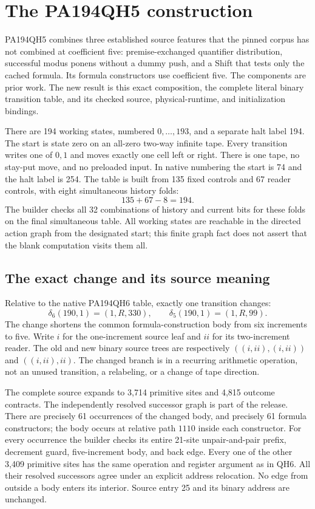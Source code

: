 \section{The PA194QH5 construction}
\label{sec:qh5}

PA194QH5 combines three established source features that the pinned corpus
has not combined at coefficient five: premise-exchanged quantifier
distribution, successful modus ponens without a dummy push, and a Shift
that tests only the cached formula. Its formula constructors use coefficient
five. The components are prior work. The new result is this exact
composition, the complete literal binary transition table, and its checked
source, physical-runtime, and initialization bindings.

There are 194 working states, numbered $0,\ldots,193$, and a separate halt
label 194. The start is state zero on an all-zero two-way infinite tape.
Every transition writes one of $0,1$ and moves exactly one cell left or
right. There is one tape, no stay-put move, and no preloaded input.
In native numbering the start is 74 and the halt label is 254.
The table is built from 135 fixed controls and 67 reader controls, with
eight simultaneous history folds:
\[
                       135+67-8=194.
\]
The builder checks all 32 combinations of history and current bits for
these folds on the final simultaneous table. All working states are
reachable in the directed action graph from the designated start; this
finite graph fact does not assert that the blank computation visits them all.

\subsection{The exact change and its source meaning}

Relative to the native PA194QH6 table, exactly one transition changes:
\[
 \delta_6(190,1)=(1,R,330),\qquad
 \delta_5(190,1)=(1,R,99).
\]
The change shortens the common formula-construction body from six
increments to five. Write $i$ for the one-increment source leaf and
$ii$ for its two-increment reader. The old and new binary source trees
are respectively $((i,ii),(i,ii))$ and $((i,ii),ii)$.
The changed branch is in a recurring arithmetic operation, not an unused
transition, a relabeling, or a change of tape direction.

The complete source expands to 3,714 primitive sites and 4,815 outcome
contracts. The independently resolved successor graph is part of the
release. There are precisely 61 occurrences of the changed body, and
precisely 61 formula constructors; the body occurs at relative path
$1110$ inside each constructor. For every occurrence the builder checks
its entire 21-site unpair-and-pair prefix, decrement guard, five-increment
body, and back edge. Every one of the other 3,409 primitive sites has the
same operation and register argument as in QH6. All their resolved
successors agree under an explicit address relocation. No edge from
outside a body enters its interior. Source entry 25 and its binary
address are unchanged.

